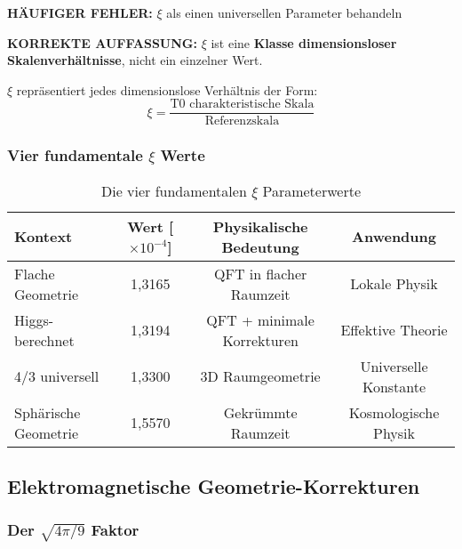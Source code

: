 \documentclass[12pt,a4paper]{article}
\newcommand{\xipar}{\ensuremath{\xi}}
\newcommand{\mypi}{\ensuremath{\pi}}
\newcommand{\mytimes}{\ensuremath{\times}}
\begin{document}
	\begin{tcolorbox}[colback=red!10!white,colframe=red!75!black,title=KRITISCHE WARNUNG: $\xi$ Parameter Verwirrung]
		\textbf{HÄUFIGER FEHLER:} $\xi$ als einen universellen Parameter behandeln
		
		\textbf{KORREKTE AUFFASSUNG:} $\xi$ ist eine \textbf{Klasse dimensionsloser Skalenverhältnisse}, nicht ein einzelner Wert.
		
		$\xi$ repräsentiert jedes dimensionslose Verhältnis der Form:
		\begin{equation}
			\xipar = \frac{\text{T0 charakteristische Skala}}{\text{Referenzskala}}
		\end{equation}
	\end{tcolorbox}
	
	\subsubsection{Vier fundamentale $\xi$ Werte}
	\label{subsubsec:vier_fundamentale_werte}
	
	\begin{table}[htbp]
		\centering
		\begin{tabular}{lccc}
			\toprule
			\textbf{Kontext} & \textbf{Wert [$\mytimes 10^{-4}$]} & \textbf{Physikalische Bedeutung} & \textbf{Anwendung} \\
			\midrule
			Flache Geometrie & 1,3165 & QFT in flacher Raumzeit & Lokale Physik \\
			Higgs-berechnet & 1,3194 & QFT + minimale Korrekturen & Effektive Theorie \\
			4/3 universell & 1,3300 & 3D Raumgeometrie & Universelle Konstante \\
			Sphärische Geometrie & 1,5570 & Gekrümmte Raumzeit & Kosmologische Physik \\
			\bottomrule
		\end{tabular}
		\caption{Die vier fundamentalen $\xi$ Parameterwerte}
		\label{tab:vier_xi_werte}
	\end{table}
	
	\subsection{Elektromagnetische Geometrie-Korrekturen}
	\label{subsec:em_korrekturen}
	
	\subsubsection{Der $\sqrt{4\mypi/9}$ Faktor}
	\label{subsubsec:korrekturfaktor}
	
\end{document}
